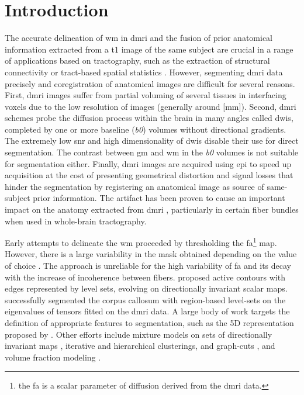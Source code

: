 \section{Introduction}\label{sec:introduction}
The accurate delineation of \gls*{wm} in \gls*{dmri} and the fusion of prior
  anatomical information extracted from a \gls*{t1} image of the same subject
  are crucial in a range of applications based on tractography, such as
  the extraction of structural connectivity \citep{craddock_imaging_2013} or
  tract-based spatial statistics \citep{smith_tractbased_2006}.
However, segmenting \gls*{dmri} data precisely and coregistration of anatomical
  images are difficult for several reasons.
First, \gls{dmri} images suffer from partial voluming of several tissues in 
  interfacing voxels due to the low resolution of images (generally around
   [mm]).
Second, \gls*{dmri} schemes probe the diffusion process within the brain in 
  many angles called \glspl*{dwi}, completed by one or more baseline (\emph{b0}) 
  volumes without directional gradients.
The extremely low \gls*{snr} and high dimensionality of \glspl*{dwi} disable their
  use for direct segmentation.
The contrast between \gls*{gm} and \gls*{wm} in the \emph{b0} volumes is not suitable for 
  segmentation either.
Finally, \gls*{dmri} images are acquired using \gls*{epi} to speed up acquisition
  at the cost of presenting geometrical distortion and 
  signal losses \citep{jezzard_correction_1995} that hinder the segmentation by
  registering an anatomical image as source of same-subject prior information.
The artifact has been proven to cause an important impact on the anatomy extracted
  from \gls*{dmri} \citep{irfanoglu_effects_2012}, particularly in certain fiber bundles
  when used in whole-brain tractography.

Early attempts to delineate the \gls*{wm} proceeded by thresholding the 
  \gls*{fa}\footnote{the \gls*{fa} is a scalar parameter of diffusion derived from
  the \gls*{dmri} data.} map.
However, there is a large variability in the mask obtained depending on the value of
  choice \citep{taoka_fractional_2009}.
The approach is unreliable for the high variability of \gls*{fa} and its
  decay with the increase of incoherence between fibers.
\cite{zhukov_level_2003} proposed active contours with edges represented
  by level sets, evolving on directionally invariant scalar maps.
\cite{rousson_level_2004} successfully segmented the corpus callosum with
  region-based level-sets on the eigenvalues of tensors fitted on the
  \gls*{dmri} data.
A large body of work targets the definition of appropriate features to segmentation,
  such as the 5D representation proposed by \cite{jonasson_segmentation_2005}.
Other efforts include mixture models on sets of directionally invariant maps
  \citep{liu_brain_2007}, iterative \citep{hadjiprocopis_unbiased_2005} and
  hierarchical \citep{lu_segmentation_2008} clusterings,
  and graph-cuts \citep{han_experimental_2009},
  and volume fraction modeling \citep{kumazawa_improvement_2013}.
 

